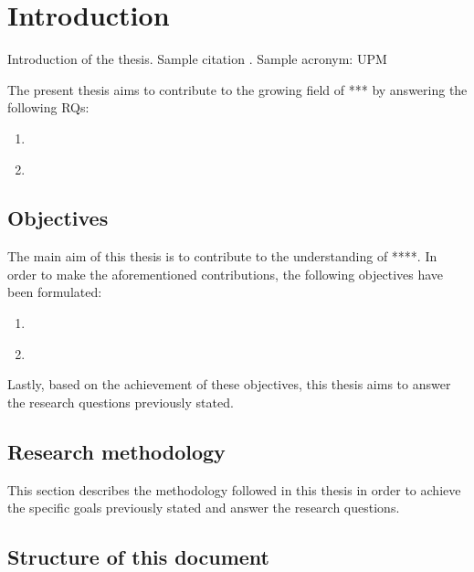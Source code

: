 \chapter{Introduction}
\label{chapter:intro}

Introduction of the thesis. Sample citation \cite{comparing}. Sample acronym: \ac{UPM} 



The present thesis aims to contribute to the growing field of *** by answering the following \acp{RQ}:
 
\begin{enumerate}
    \item \label{rq:one} \textit{}
    \item \label{rq:two} \textit{}
\end{enumerate}



\section{Objectives}

The main aim of this thesis is to contribute to the understanding of ****. In order to make the aforementioned contributions, the following objectives have been formulated:

\begin{enumerate}
    \item \label{obj:one} \textit{}
    
    \item \label{obj:two} \textit{}
    
    
\end{enumerate}

Lastly, based on the achievement of these objectives, this thesis aims to answer the research questions previously stated.

\section{Research methodology}

This section describes the methodology followed in this thesis in order to achieve the specific goals previously stated and answer the research questions.

\section{Structure of this document}

